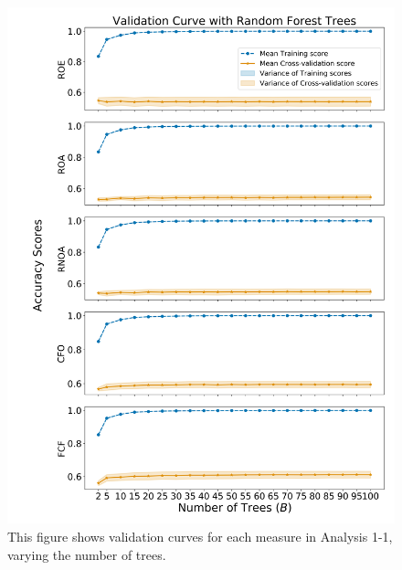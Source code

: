 \begin{figure}[htb!]
    \centering
    \includegraphics[width=\textwidth,height=0.87\textheight,keepaspectratio]{figures/ABIS/analysis_1-1_ValidationCurveTrees.png}

   \caption{This figure shows validation curves for each measure in Analysis 1-1, varying the number of trees. }
      \label{fig:ValidationCurve-A1-Trees}
\end{figure}

